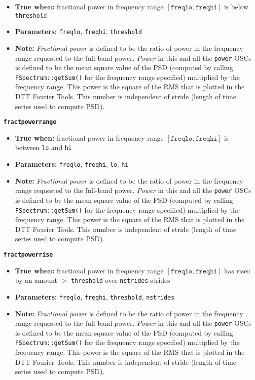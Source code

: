 \documentclass[11pt]{article}
\begin{document}
\begin{itemize}
\item \textbf{True when:} fractional power in frequency range
  $[\mathtt{freqlo}, \mathtt{freqhi}]$ is below \texttt{threshold}
\item \textbf{Parameters:} \texttt{freqlo}, \texttt{freqhi}, \texttt{threshold}
\item \textbf{Note:} \textit{Fractional power} is defined to be the
  ratio of power in the frequency range requested to the full-band
  power.  \textit{Power} in this and all the \texttt{power}
  OSCs is defined to be the mean square value of the PSD
  (computed by calling \texttt{FSpectrum::getSum()} for the
  frequency range specified) multiplied by the frequency range. This
  power is the square of the RMS that is plotted in the DTT Fourier
  Tools. This number is independent of stride (length of time series
  used to compute PSD). 
\end{itemize}


{\large\texttt{\textbf{fractpowerrange}}}

\begin{itemize}
\item \textbf{True when:} fractional power in frequency range
  $[\mathtt{freqlo}, \mathtt{freqhi}]$ is between \texttt{lo} and \texttt{hi}
\item \textbf{Parameters:} \texttt{freqlo}, \texttt{freqhi},
  \texttt{lo}, \texttt{hi} 
\item \textbf{Note:} \textit{Fractional power} is defined to be the
  ratio of power in the frequency range requested to the full-band
  power.  \textit{Power} in this and all the \texttt{power}
  OSCs is defined to be the mean square value of the PSD
  (computed by calling \texttt{FSpectrum::getSum()} for the
  frequency range specified) multiplied by the frequency range. This
  power is the square of the RMS that is plotted in the DTT Fourier
  Tools.  This number is independent of stride (length of time series
  used to compute PSD). 
\end{itemize}

{\large\texttt{\textbf{fractpowerrise}}}

\begin{itemize}
\item \textbf{True when:} fractional power in frequency range
  $[\mathtt{freqlo}, \mathtt{freqhi}]$ has risen by an amount $>$
  \texttt{threshold} over \texttt{nstrides} strides
\item \textbf{Parameters:} \texttt{freqlo}, \texttt{freqhi},
  \texttt{threshold}, \texttt{nstrides}
\item \textbf{Note:} \textit{Fractional power} is defined to be the
  ratio of power in the frequency range requested to the full-band
  power.  \textit{Power} in this and all the \texttt{power}
  OSCs is defined to be the mean square value of the PSD
  (computed by calling \texttt{FSpectrum::getSum()} for the
  frequency range specified) multiplied by the frequency range.  This
  power is the square of the RMS that is plotted in the DTT Fourier
  Tools. This number is independent of stride (length of time series
  used to compute PSD). 
\end{itemize}
\end{document}
